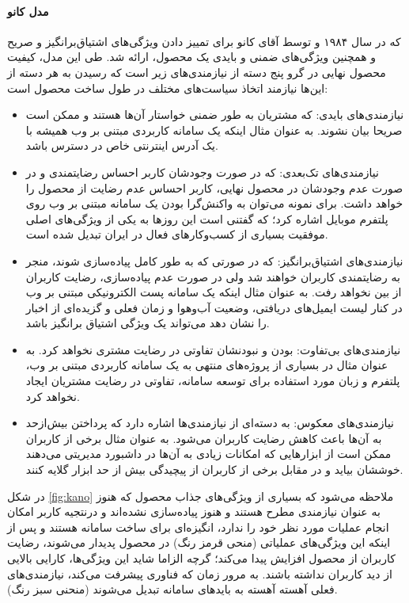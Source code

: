 \paragraph{مدل کانو}
که در سال ۱۹۸۴ و توسط آقای کانو
\cite{kano_attractive_1984}
برای تمییز دادن ویژگی‌های اشتیاق‌برانگیز و صریح و همچنین ویژگی‌های ضمنی و بایدی یک محصول، ارائه شد. طی این مدل، کیفیت محصول نهایی در گرو پنج دسته از نیازمندی‌های زیر است که رسیدن به هر دسته از این‌ها نیازمند اتخاذ سیاست‌های مختلف در طول ساخت محصول است:
\begin{itemize}
	\item 
	نیازمندی‌های بایدی: که مشتریان به طور ضمنی خواستار آن‌ها هستند و ممکن است صریحا بیان نشوند. به عنوان مثال اینکه یک سامانه کاربردی مبتنی بر وب همیشه با یک آدرس اینترنتی خاص
	در دسترس باشد.
	\item
	نیازمندی‌های تک‌بعدی: که در صورت وجودشان کاربر احساس رضایتمندی و در صورت عدم وجودشان در محصول نهایی، کاربر احساس عدم رضایت از محصول را خواهد داشت. برای نمونه می‌توان به واکنش‌گرا بودن یک سامانه مبتنی بر وب روی پلتفرم موبایل اشاره کرد؛ که گفتنی است این روزها به یکی از ویژگی‌های اصلی موفقیت بسیاری از کسب‌وکارهای فعال در ایران تبدیل شده است.
	\item 
	نیازمندی‌های اشتیاق‌برانگیز: که در صورتی که به طور کامل پیاده‌سازی شوند، منجر به رضایتمندی کاربران خواهند شد ولی در صورت عدم پیاده‌سازی، رضایت کاربران از بین نخواهد رفت. به عنوان مثال اینکه یک سامانه پست الکترونیکی مبتنی بر وب در کنار لیست ایمیل‌های دریافتی، وضعیت آب‌وهوا و زمان فعلی و گزیده‌ای از اخبار را نشان دهد می‌تواند یک ویژگی اشتیاق برانگیز باشد.
	\item 
	نیازمندی‌های بی‌تفاوت: بودن و نبودنشان تفاوتی در رضایت مشتری نخواهد کرد. به عنوان مثال در بسیاری از پروژه‌های منتهی به یک سامانه کاربردی مبتنی بر وب، پلتفرم و زبان مورد استفاده برای توسعه سامانه، تفاوتی در رضایت مشتریان ایجاد نخواهد کرد.
	\item 
	نیازمندی‌های معکوس: به دسته‌ای از نیازمندی‌ها اشاره دارد که پرداختن بیش‌ازحد به آن‌ها باعث کاهش رضایت کاربران می‌شود. به عنوان مثال برخی از کاربران ممکن است از ابزارهایی که امکانات زیادی به آن‌ها در داشبورد مدیریتی می‌دهند خوششان بیاید و در مقابل برخی از کاربران از پیچیدگی بیش از حد ابزار گلایه کنند.
\end{itemize}
در شکل
\ref{fig:kano}
ملاحظه می‌شود که بسیاری از ویژگی‌های جذاب محصول که هنوز به عنوان نیازمندی مطرح هستند و هنوز پیاده‌سازی نشده‌اند و درنتجیه کاربر امکان انجام عملیات مورد نظر خود را ندارد، انگیزه‌ای برای ساخت سامانه هستند و پس از اینکه این ویژگی‌های عملیاتی (منحی قرمز رنگ) در محصول پدیدار می‌شوند، رضایت کاربران از محصول افزایش پیدا می‌کند؛ گرچه الزاما شاید این ویژگی‌ها، کارایی بالایی از دید کاربران نداشته باشند. به مرور زمان که فناوری پیشرفت می‌کند، نیازمندی‌های فعلی آهسته آهسته به باید‌های سامانه تبدیل می‌شوند (منحنی سبز رنگ).\\
